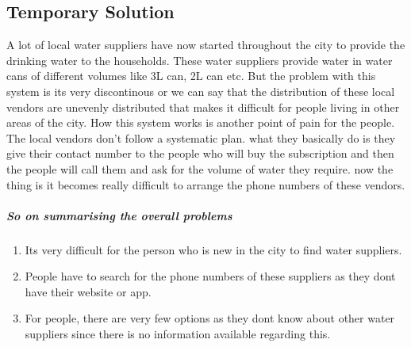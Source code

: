 \documentclass[a4paper, 12pt]{article}
\begin{document}
\subsection[short]{Temporary Solution}
A lot of local water suppliers have now started throughout the city to provide the drinking water to the households. These water suppliers provide water in water cans 
of different volumes like 3L can, 2L can etc. But the problem with this system is its very discontinous or we can say that the distribution of these local vendors are
unevenly distributed that makes it difficult for people living in other areas of the city. How this system works is another point of pain for the people. The local vendors
don't follow a systematic plan. what they basically do is they give their contact number to the people who will buy the subscription and then the people will call them and
ask for the volume of water they require. now the thing is it becomes really difficult to arrange the phone numbers of these vendors. 
\subparagraph*{So on summarising the overall problems}

\begin{enumerate}
    \item Its very difficult for the person who is new in the city to find water suppliers.
    \item People have to search for the phone numbers of these suppliers as they dont have their website or app.
    \item For people, there are very few options as they dont know about other water suppliers since there is no information available regarding this.
\end{enumerate}
\end{document}
